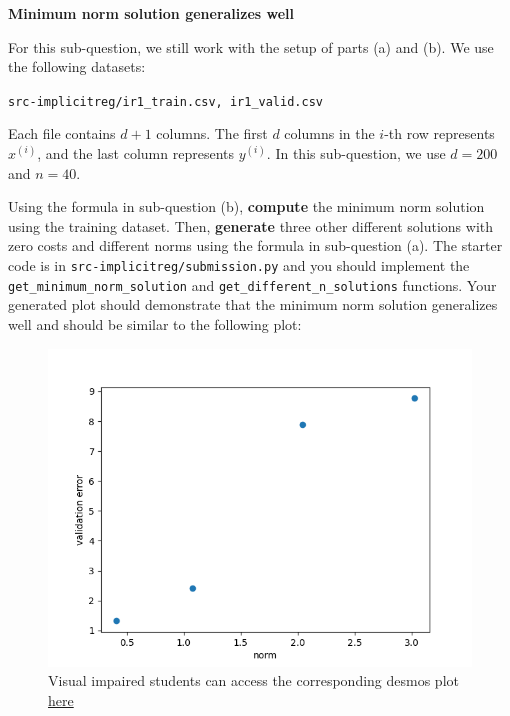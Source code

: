 \item {} \textbf{Minimum norm solution generalizes well}

For this sub-question, we still work with the setup of parts (a) and (b). We use the following datasets:
\begin{center}
	\texttt{src-implicitreg/ir1\_train.csv, ir1\_valid.csv}
\end{center}
Each file contains $d+1$ columns. The first $d$ columns in the $i$-th row represents $x^{(i)}$, and the last column represents $y^{(i)}.$ In this sub-question, we use $d=200$ and $n=40$.

Using the formula in sub-question (b), \textbf{compute} the minimum norm solution using the training dataset. Then, \textbf{generate} three other different solutions with zero costs and different norms using the formula in sub-question (a).
The starter code is in \texttt{src-implicitreg/submission.py} and you should implement the \texttt{get\_minimum\_norm\_solution} and \texttt{get\_different\_n\_solutions} functions.  
Your generated plot should demonstrate that the minimum norm solution generalizes well and should be similar to the following plot:

\begin{figure}[H]
	\centering
	\includegraphics[width=.5\linewidth]{04-implicitreg/implicitreg_linear.png}
	\caption{Visual impaired students can access the corresponding desmos plot \href{https://www.desmos.com/calculator/b5ef1cvybm}{here}}
\end{figure}